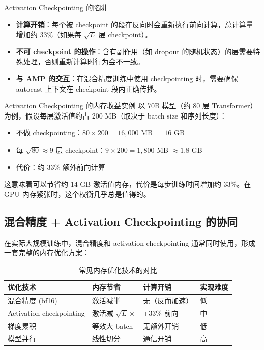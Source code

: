 \documentclass[a4paper]{article}
\begin{document}
\begin{warningbox}{Activation Checkpointing 的陷阱}
\begin{itemize}
    \item \textbf{计算开销}：每个被 checkpoint 的段在反向时会重新执行前向计算，总计算量增加约 33\%（如果每 $\sqrt{L}$ 层 checkpoint）。
    \item \textbf{不可 checkpoint 的操作}：含有副作用（如 dropout 的随机状态）的层需要特殊处理，否则重新计算时行为会不一致。
    \item \textbf{与 AMP 的交互}：在混合精度训练中使用 checkpointing 时，需要确保 autocast 上下文在 checkpoint 段内正确传播。
\end{itemize}
\end{warningbox}

\begin{knowledgebox}{Activation Checkpointing 的内存收益实例}
以 70B 模型（约 80 层 Transformer）为例，假设每层激活值约占 200 MB（取决于 batch size 和序列长度）：
\begin{itemize}
    \item 不做 checkpointing：$80 \times 200 = 16,000$ MB $= 16$ GB
    \item 每 $\sqrt{80} \approx 9$ 层 checkpoint：$9 \times 200 = 1,800$ MB $\approx 1.8$ GB
    \item 代价：约 33\% 额外前向计算
\end{itemize}
这意味着可以节省约 14 GB 激活值内存，代价是每步训练时间增加约 33\%。在 GPU 内存紧张时，这个权衡几乎总是值得的。
\end{knowledgebox}

\subsection{混合精度 + Activation Checkpointing 的协同}

在实际大规模训练中，混合精度和 activation checkpointing 通常同时使用，形成一套完整的内存优化方案：

\begin{table}[H]
\centering
\begin{tabular}{p{}p{}p{}p{}}
\toprule
\textbf{优化技术} & \textbf{内存节省} & \textbf{计算开销} & \textbf{实现难度} \\
\midrule
混合精度 (bf16) & 激活减半 & 无（反而加速） & 低 \\
Activation checkpointing & 激活减 $\sqrt{L}\times$ & +33\% 前向 & 中 \\
梯度累积 & 等效大 batch & 无额外开销 & 低 \\
模型并行 & 线性切分 & 通信开销 & 高 \\
\bottomrule
\end{tabular}
\caption{常见内存优化技术的对比}
\end{table}
\end{document}
